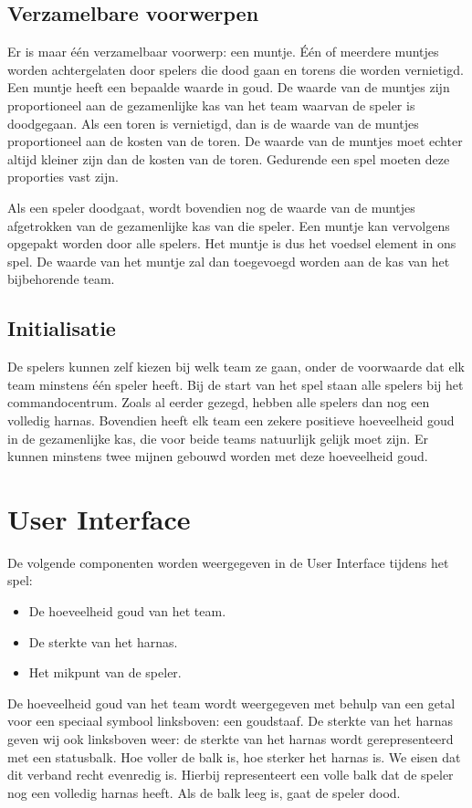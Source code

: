 \subsection{Verzamelbare voorwerpen}
Er is maar \'e\'en verzamelbaar voorwerp: een muntje. \'E\'en of meerdere muntjes worden achtergelaten door spelers die dood gaan en torens die worden vernietigd. Een muntje heeft een bepaalde waarde in goud. De waarde van de muntjes zijn proportioneel aan de gezamenlijke kas van het team waarvan de speler is doodgegaan. Als een toren is vernietigd, dan is de waarde van de muntjes proportioneel aan de kosten van de toren. De waarde van de muntjes moet echter altijd kleiner zijn dan de kosten van de toren. Gedurende een spel moeten deze proporties vast zijn.

Als een speler doodgaat, wordt bovendien nog de waarde van de muntjes afgetrokken van de gezamenlijke kas van die speler. Een muntje kan vervolgens opgepakt worden door alle spelers. Het muntje is dus het voedsel element in ons spel. De waarde van het muntje zal dan toegevoegd worden aan de kas van het bijbehorende team.

\subsection{Initialisatie}
De spelers kunnen zelf kiezen bij welk team ze gaan, onder de voorwaarde dat elk team minstens \'e\'en speler heeft. Bij de start van het spel staan alle spelers bij het commandocentrum. Zoals al eerder gezegd, hebben alle spelers dan nog een volledig harnas. Bovendien heeft elk team een zekere positieve hoeveelheid goud in de gezamenlijke kas, die voor beide teams natuurlijk gelijk moet zijn. Er kunnen minstens twee mijnen gebouwd worden met deze hoeveelheid goud.

\section{User Interface}
De volgende componenten worden weergegeven in de User Interface tijdens het spel:
\begin{itemize}
\item De hoeveelheid goud van het team.
\item De sterkte van het harnas.
\item Het mikpunt van de speler. 
\end{itemize}

De hoeveelheid goud van het team wordt weergegeven met behulp van een getal voor een speciaal symbool linksboven: een goudstaaf. De sterkte van het harnas geven wij ook linksboven weer: de sterkte van het harnas wordt gerepresenteerd met een statusbalk. Hoe voller de balk is, hoe sterker het harnas is. We eisen dat dit verband recht evenredig is. Hierbij representeert een volle balk dat de speler nog een volledig harnas heeft. Als de balk leeg is, gaat de speler dood. 

